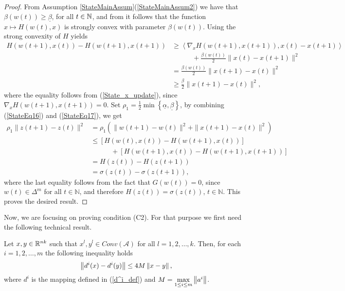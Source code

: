 \begin{proof}
From Assumption \ref{StateMainAssum}(\ref{StateMainAssum2}) we have that $\beta(w(t)) \geq \underline{\beta}$, for all $t \in \mathbb{N}$, and from  it follows that the function $x \mapsto H(w(t),x)$ is strongly convex with parameter $\beta(w(t))$. Using the strong convexity of $H$ yields
\begin{align}
	H(w(t+1),x(t))  - H(w(t+1),x(t+1)) &\geq \left\langle \nabla_x H(w(t+1),x(t+1)) , x(t)-x(t+1) \right\rangle \nonumber \\
	&\quad\quad\quad + \frac{\beta(w(t))}{2} \|x(t) - x(t+1)\|^2 \nonumber \\
	& = \frac{\beta(w(t))}{2} \|x(t+1) - x(t)\|^2  \nonumber \\
	& \geq \frac{\underline{\beta}}{2} \|x(t+1) - x(t)\|^2 , \label{StateEq17}
\end{align}
where the equality follows from (\ref{State_x_update}), since $\nabla_{x} H(w(t+1), x(t+1)) = 0$.
Set $\rho_1 = \frac{1}{2}\min\left\lbrace \underline{\alpha} , \underline{\beta} \right\rbrace$, by combining (\ref{StateEq16}) and (\ref{StateEq17}), we get
\begin{align*}
	\rho_1 \|z(t+1)- z(t)\|^2 
	&= \rho_1 \left( \|w(t+1) - w(t)\|^2 + \|x(t+1) - x(t)\|^2  \right) \\
	&\leq \left[ H(w(t),x(t)) - H(w(t+1),x(t)) \right] \\
	&\quad\quad\quad + \left[ H(w(t+1),x(t)) - H(w(t+1),x(t+1)) \right] \\
	&= H(z(t)) - H(z(t+1)) \\
	&= \sigma(z(t)) - \sigma(z(t+1)),
\end{align*}
where the last equality follows from the fact that $G(w(t)) = 0$, since $w(t) \in \Delta^m$ for all $t \in \mathbb{N}$, and therefore $H(z(t))=\sigma(z(t))$, $t \in \mathbb{N}$. This proves the desired result.
\end{proof}

Now, we are focusing on proving condition (C2). For that purpose we first need the following technical result.

\begin{lemma} \label{StateEq11}
Let $x,y \in \mathbb{R}^{nk}$ such that $x^l,y^l \in Conv\left(\mathcal{A}\right)$ for all $l=1,2,\ldots,k$. Then, for each $i=1,2,\ldots,m$ the following inequality holds
\begin{equation*}
	\left\Vert {d^i(x) - d^i(y)} \right\Vert \leq 4M \left\Vert {x - y} \right\Vert,
\end{equation*}
where $d^i$ is the mapping defined in (\ref{d^i_def}) and $M = \max\limits_{1 \leq i \leq m} \left\Vert {a^i} \right\Vert$.
\end{lemma}

